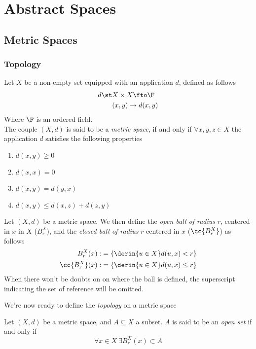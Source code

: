 \documentclass[../mmf.tex]{subfiles}
\begin{document}
\chapter{Abstract Spaces}
\section{Metric Spaces}
\subsection{Topology}
\begin{dfn}
	Let $X$ be a non-empty set equipped with an application $d$, defined as follows
	\begin{equation}
		\begin{aligned}
			d\st&X\times X\fto\F\\
			&(x,y)\to d(x,y)
		\end{aligned}
		\label{eq:distdef}
	\end{equation}
	Where $\F$ is an ordered field.\\
	The couple $(X,d)$ is said to be a \textit{metric space}, if and only if $\forall x,y,z\in X$ the application $d$ satisfies the following properties
	\begin{enumerate}
	\item $d(x,y)\ge0$
	\item $d(x,x)=0$
	\item $d(x,y)=d(y,x)$
	\item $d(x,y)\le  d(x,z)+d(z,y)$
	\end{enumerate}
\end{dfn}
\begin{dfn}[Ball]
	Let $(X,d)$ be a metric space. We then define the \textit{open ball of radius} $r$, centered in $x$ in $X$ ($B_r^X$), and the \textit{closed ball of radius} $r$ centered in $x$ ($\cc{B_r^X}$) as follows
	\begin{equation}
		\begin{aligned}
			B_r^X(x):&=\{\derin{u\in X}d(u,x)<r\}\\
			\cc{B_r^X}(x):&=\{\derin{u\in X}d(u,x)\le r\}
		\end{aligned}
		\label{eq:openclosedball}
	\end{equation}
	When there won't be doubts on on where the ball is defined, the superscript indicating the set of reference will be omitted.
\end{dfn}
We're now ready to define the \textit{topology} on a metric space
\begin{dfn}
	Let $(X,d)$ be a metric space, and $A\subseteq X$ a subset. $A$ is said to be an \textit{open set} if and only if
	\begin{equation}
		\forall x\in X\ \exists B_r^X(x)\subset A
		\label{eq:opensetdef}
	\end{equation}
\end{dfn}
\end{document}
